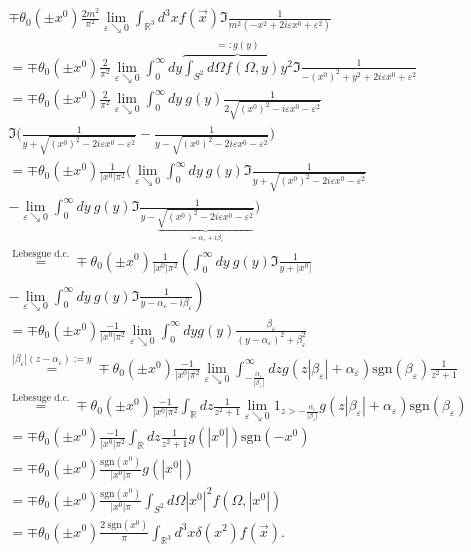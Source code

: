 \documentclass[a4paper,11pt]{article}
\begin{document}
\begin{align}
\mp \theta_0(\pm x^0) \frac{2 m^2}{\pi^2} \lim_{\varepsilon \searrow 0} \int_{\mathbb{R}^3} d^3x f(\vec{x}) \Im \frac{1}{m^2 (-x^2 + 2 i \varepsilon x^0 + \varepsilon^2)}\\
=\mp \theta_0(\pm x^0) \frac{2 }{\pi^2} \lim_{\varepsilon \searrow 0}\int_0^\infty dy  \overbrace{\int_{S^2} d\Omega f(\Omega, y) y^2}^{=:g(y)} \Im \frac{1}{-(x^0)^2+ y^2 + 2 i \varepsilon x^0 + \varepsilon^2}\\
=\mp \theta_0(\pm x^0) \frac{2 }{\pi^2} \lim_{\varepsilon \searrow 0}\int_0^\infty dy~ g(y)\frac{1}{2\sqrt{(x^0)^2-i \varepsilon x^0 - \varepsilon^2}} \\
\Im 
 \Big(\frac{1}{y+ \sqrt{(x^0)^2-2 i \varepsilon x^0 - \varepsilon^2}}-\frac{1}{y- \sqrt{(x^0)^2-2 i \varepsilon x^0 - \varepsilon^2}} \Big)\\
=\mp \theta_0(\pm x^0) \frac{1 }{|x^0|\pi^2} 
 \Big(\lim_{\varepsilon \searrow 0}\int_0^\infty dy~ g(y) \Im \frac{1}{y+ \sqrt{(x^0)^2-2 i \varepsilon x^0 - \varepsilon^2}}\\
-\lim_{\varepsilon \searrow 0}\int_0^\infty dy~ g(y) \Im \frac{1}{y- \underbrace{\sqrt{(x^0)^2-2 i \varepsilon x^0 - \varepsilon^2}}_{:= \alpha_\varepsilon + i \beta_\varepsilon}}\Big)\\
\overset{\text{Lebesgue d.c.}}{=}\mp \theta_0(\pm x^0) \frac{1 }{|x^0|\pi^2} 
 \left(\int_0^\infty dy~ g(y) \Im \frac{1}{y+|x^0|}\right.\\
\left.-\lim_{\varepsilon \searrow 0}\int_0^\infty dy~ g(y) \Im \frac{1}{y- \alpha_\varepsilon -i \beta_\varepsilon}\right)\\
=\mp \theta_0(\pm x^0) \frac{-1 }{|x^0|\pi^2} \lim_{\varepsilon \searrow 0} \int_0^\infty dy g(y) \frac{\beta_\varepsilon}{(y-\alpha_\varepsilon)^2+\beta_\varepsilon^2}\\
\overset{|\beta_\varepsilon|(z-\alpha_\varepsilon) :=y}{=}\mp \theta_0(\pm x^0) \frac{-1 }{|x^0|\pi^2} 
\lim_{\varepsilon \searrow 0} \int_{-\frac{\alpha_\varepsilon}{|\beta_\varepsilon|}}^\infty dz 
 g(z |\beta_\varepsilon|+\alpha_\varepsilon) \text{sgn}(\beta_\varepsilon) \frac{1}{ z^2+1}\\
 \overset{\text{Lebesuge d.c.}}{=}\mp \theta_0(\pm x^0) \frac{-1 }{|x^0|\pi^2} 
\int_\mathbb{R} dz\frac{1}{z^2+1}\lim_{\varepsilon \searrow 0}  1_{z>-\frac{\alpha_\varepsilon}{|\beta_\varepsilon|}} g(z |\beta_\varepsilon|+\alpha_\varepsilon) \text{sgn}(\beta_\varepsilon)\\
=\mp \theta_0(\pm x^0) \frac{-1 }{|x^0|\pi^2} \int_\mathbb{R} dz\frac{1}{z^2+1}  g(|x^0|) \text{sgn}(- x^0)\\
=\mp \theta_0(\pm x^0) \frac{\text{sgn}(x^0)}{|x^0| \pi} g(|x^0|)\\
=\mp \theta_0(\pm x^0) \frac{\text{sgn}(x^0)}{|x^0| \pi} \int_{S^2} d\Omega |x^0|^2 f(\Omega, |x^0|)\\
=\mp \theta_0(\pm x^0) \frac{2~\text{sgn}(x^0)}{ \pi} \int_{\mathbb{R}^3} d^3x \delta(x^2) f(\vec{x}).
\end{align}
\end{document}
